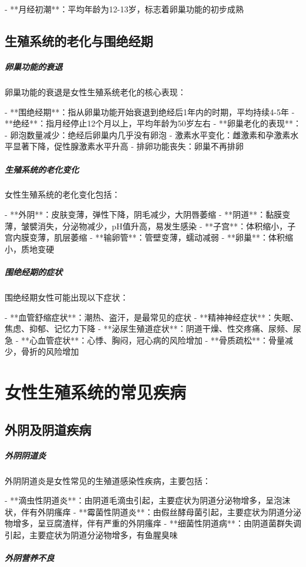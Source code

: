 \begin{enumerate}
- **月经初潮**：平均年龄为12-13岁，标志着卵巢功能的初步成熟

\subsection{生殖系统的老化与围绝经期}

\subparagraph{卵巢功能的衰退}

卵巢功能的衰退是女性生殖系统老化的核心表现：

- **围绝经期**：指从卵巢功能开始衰退到绝经后1年内的时期，平均持续4-5年
- **绝经**：指月经停止12个月以上，平均年龄为50岁左右
- **卵巢老化的表现**：
  - 卵泡数量减少：绝经后卵巢内几乎没有卵泡
  - 激素水平变化：雌激素和孕激素水平显著下降，促性腺激素水平升高
  - 排卵功能丧失：卵巢不再排卵

\subparagraph{生殖系统的老化变化}

女性生殖系统的老化变化包括：

- **外阴**：皮肤变薄，弹性下降，阴毛减少，大阴唇萎缩
- **阴道**：黏膜变薄，皱襞消失，分泌物减少，pH值升高，易发生感染
- **子宫**：体积缩小，子宫内膜变薄，肌层萎缩
- **输卵管**：管壁变薄，蠕动减弱
- **卵巢**：体积缩小，质地变硬

\subparagraph{围绝经期的症状}

围绝经期女性可能出现以下症状：

- **血管舒缩症状**：潮热、盗汗，是最常见的症状
- **精神神经症状**：失眠、焦虑、抑郁、记忆力下降
- **泌尿生殖道症状**：阴道干燥、性交疼痛、尿频、尿急
- **心血管症状**：心悸、胸闷，冠心病的风险增加
- **骨质疏松**：骨量减少，骨折的风险增加

\section{女性生殖系统的常见疾病}

\subsection{外阴及阴道疾病}

\subparagraph{外阴阴道炎}

外阴阴道炎是女性常见的生殖道感染性疾病，主要包括：

- **滴虫性阴道炎**：由阴道毛滴虫引起，主要症状为阴道分泌物增多，呈泡沫状，伴有外阴瘙痒
- **霉菌性阴道炎**：由假丝酵母菌引起，主要症状为阴道分泌物增多，呈豆腐渣样，伴有严重的外阴瘙痒
- **细菌性阴道病**：由阴道菌群失调引起，主要症状为阴道分泌物增多，有鱼腥臭味

\subparagraph{外阴营养不良}


\end{enumerate}
